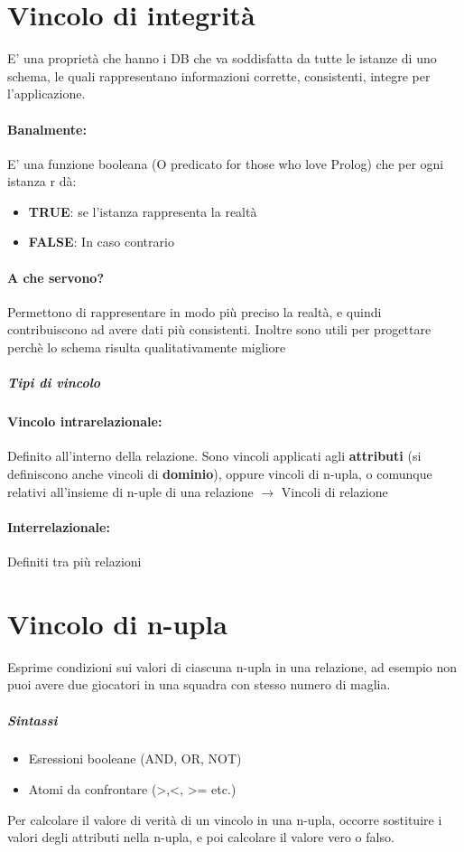 \documentclass[12pt, a4paper, openany, twoside]{book}
\begin{document}
\section{Vincolo di integrità}
E' una proprietà che hanno i DB che va soddisfatta da tutte le istanze di uno
schema, le quali rappresentano informazioni corrette, consistenti, integre per
l'applicazione.
\paragraph{Banalmente:} E' una funzione booleana (O predicato for those who 
love Prolog) che per ogni istanza r dà:
\begin{itemize}
	\item \textbf{TRUE}: se l'istanza rappresenta la realtà
	\item \textbf{FALSE}: In caso contrario
\end{itemize}
\paragraph{A che servono?} Permettono di rappresentare in modo più preciso la
realtà, e quindi contribuiscono ad avere dati più consistenti. Inoltre sono
utili per progettare perchè lo schema risulta qualitativamente migliore
\subparagraph{Tipi di vincolo}
\paragraph{Vincolo intrarelazionale:} Definito all'interno della relazione.
Sono vincoli applicati agli \textbf{attributi} (si definiscono anche vincoli
di \textbf{dominio}), oppure vincoli di n-upla, o comunque relativi all'insieme
di n-uple di una relazione $\to$ Vincoli di relazione
\paragraph{Interrelazionale:} Definiti tra più relazioni
\section{Vincolo di n-upla}
Esprime condizioni sui valori di ciascuna n-upla in una relazione, ad esempio
non puoi avere due giocatori in una squadra con stesso numero di maglia.
\subparagraph{Sintassi}
\begin{itemize}
		\item Esressioni booleane (AND, OR, NOT)
		\item Atomi da confrontare (>,<, >= etc.)
\end{itemize}	
Per calcolare il valore di verità di un vincolo in una n-upla, occorre sostituire
i valori degli attributi nella n-upla, e poi calcolare il valore vero o falso.
\end{document}
